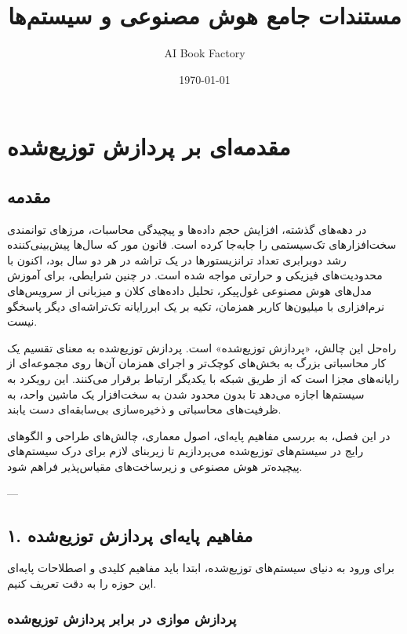\documentclass[12pt,a4paper,openany]{book}
\title{مستندات جامع هوش مصنوعی و سیستم‌ها}
\author{AI Book Factory}
\date{\today}
\begin{document}
\maketitle
\tableofcontents
\clearpage

\chapter{مقدمه‌ای بر پردازش توزیع‌شده}

\section{مقدمه}

در دهه‌های گذشته، افزایش حجم داده‌ها و پیچیدگی محاسبات، مرزهای توانمندی سخت‌افزارهای تک‌سیستمی را جابه‌جا کرده است. قانون مور  که سال‌ها پیش‌بینی‌کننده رشد دوبرابری تعداد ترانزیستورها در یک تراشه در هر دو سال بود، اکنون با محدودیت‌های فیزیکی و حرارتی مواجه شده است. در چنین شرایطی، برای آموزش مدل‌های هوش مصنوعی غول‌پیکر، تحلیل داده‌های کلان  و میزبانی از سرویس‌های نرم‌افزاری با میلیون‌ها کاربر همزمان، تکیه بر یک ابررایانه تک‌تراشه‌ای دیگر پاسخگو نیست.

راه‌حل این چالش، «پردازش توزیع‌شده»  است. پردازش توزیع‌شده به معنای تقسیم یک کار محاسباتی بزرگ به بخش‌های کوچک‌تر و اجرای همزمان آن‌ها روی مجموعه‌ای از رایانه‌های مجزا است که از طریق شبکه با یکدیگر ارتباط برقرار می‌کنند. این رویکرد به سیستم‌ها اجازه می‌دهد تا بدون محدود شدن به سخت‌افزار یک ماشین واحد، به ظرفیت‌های محاسباتی و ذخیره‌سازی بی‌سابقه‌ای دست یابند.

در این فصل، به بررسی مفاهیم پایه‌ای، اصول معماری، چالش‌های طراحی و الگوهای رایج در سیستم‌های توزیع‌شده می‌پردازیم تا زیربنای لازم برای درک سیستم‌های پیچیده‌تر هوش مصنوعی و زیرساخت‌های مقیاس‌پذیر فراهم شود.

---

\section{۱. مفاهیم پایه‌ای پردازش توزیع‌شده}

برای ورود به دنیای سیستم‌های توزیع‌شده، ابتدا باید مفاهیم کلیدی و اصطلاحات پایه‌ای این حوزه را به دقت تعریف کنیم.

\subsection{پردازش موازی در برابر پردازش توزیع‌شده}
\end{document}
